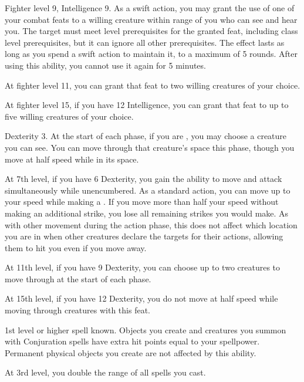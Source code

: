     \featpres Fighter level 9, Intelligence 9.
    \featben As a swift action, you may grant the use of one of your combat feats to a willing creature within \rngmed range of you who can see and hear you.
    The target must meet level prerequisites for the granted feat, including class level prerequisites, but it can ignore all other prerequisites.
    The effect lasts as long as you spend a swift action to maintain it, to a maximum of 5 rounds.
    After using this ability, you cannot use it again for 5 minutes.

    At fighter level 11, you can grant that feat to two willing creatures of your choice.

    At fighter level 15, if you have 12 Intelligence, you can grant that feat to up to five willing creatures of your choice.

    \featpres Dexterity 3.
    \featben At the start of each phase, if you are , you may choose a creature you can see.
    You can move through that creature's space this phase, though you move at half speed while in its space.

    At 7th level, if you have 6 Dexterity, you gain the ability to move and attack simultaneously while unencumbered.
    As a standard action, you can move up to your speed while making a .
    If you move more than half your speed without making an additional strike, you lose all remaining strikes you would make.
    As with other movement during the action phase, this does not affect which location you are in when other creatures declare the targets for their actions, allowing them to hit you even if you move away.

    At 11th level, if you have 9 Dexterity, you can choose up to two creatures to move through at the start of each phase.

    At 15th level, if you have 12 Dexterity, you do not move at half speed while moving through creatures with this feat.

    \featpres 1st level or higher  spell known.
    \featben Objects you create and creatures you summon with Conjuration spells have extra hit points equal to your spellpower.
    Permanent physical objects you create are not affected by this ability.

    At 3rd level, you double the range of all  spells you cast.

